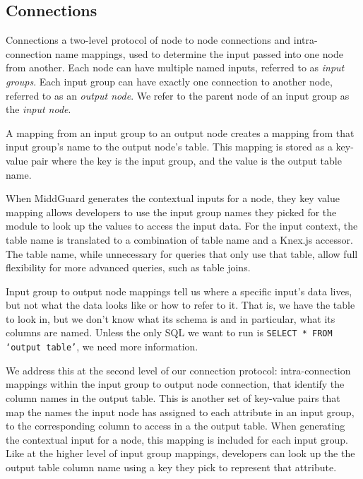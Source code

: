 \documentclass[midd]{thesis}
\begin{document}
\subsection{Connections}

Connections a two-level protocol of node to node connections and
intra-connection name mappings, used to determine the input passed into one node
from another. Each node can have multiple named inputs, referred to as
\textit{input groups}. Each input group can have exactly one connection to
another node, referred to as an \textit{output node}. We refer to the parent
node of an input group as the \textit{input node}.

A mapping from an input group to an output node creates a mapping from that
input group's name to the output node's table. This mapping is stored as a
key-value pair where the key is the input group, and the value is the output
table name.

When MiddGuard generates the contextual inputs for a node, they key value
mapping allows developers to use the input group names they picked for the
module to look up the values to access the input data. For the input context,
the table name is translated to a combination of table name and a Knex.js
accessor. The table name, while unnecessary for queries that only use that
table, allow full flexibility for more advanced queries, such as table joins.

Input group to output node mappings tell us where a specific input's data lives,
but not what the data looks like or how to refer to it. That is, we have the
table to look in, but we don't know what its schema is and in particular, what
its columns are named. Unless the only SQL we want to run is \texttt{SELECT *
FROM `output table'}, we need more information.

We address this at the second level of our connection protocol: intra-connection
mappings within the input group to output node connection, that identify the
column names in the output table. This is another set of key-value pairs that
map the names the input node has assigned to each attribute in an input group,
to the corresponding column to access in a the output table. When generating the
contextual input for a node, this mapping is included for each input group. Like
at the higher level of input group mappings, developers can look up the the
output table column name using a key they pick to represent that attribute.
\end{document}
